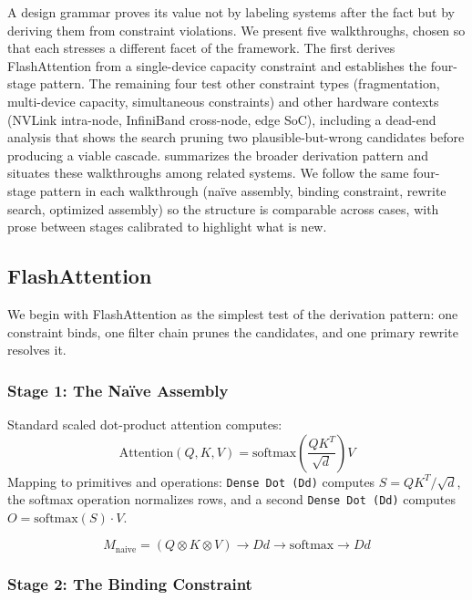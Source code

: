 \documentclass[10pt,twocolumn]{article}
\begin{document}
A design grammar proves its value not by labeling systems after the fact but by deriving them from constraint violations. We present five walkthroughs, chosen so that each stresses a different facet of the framework. The first derives FlashAttention from a single-device capacity constraint and establishes the four-stage pattern. The remaining four test other constraint types (fragmentation, multi-device capacity, simultaneous constraints) and other hardware contexts (NVLink intra-node, InfiniBand cross-node, edge SoC), including a dead-end analysis that shows the search pruning two plausible-but-wrong candidates before producing a viable cascade.  summarizes the broader derivation pattern and situates these walkthroughs among related systems. We follow the same four-stage pattern in each walkthrough (na\"ive assembly, binding constraint, rewrite search, optimized assembly) so the structure is comparable across cases, with prose between stages calibrated to highlight what is new.



\subsection{FlashAttention}
\label{sec:fa-walkthrough}

We begin with FlashAttention \citep{dao2022} as the simplest test of the derivation pattern: one constraint binds, one filter chain prunes the candidates, and one primary rewrite resolves it.

\subsubsection{Stage 1: The Na\"ive Assembly}

Standard scaled dot-product attention \citep{vaswani2017attention} computes:
\[
\text{Attention}(Q, K, V) = \text{softmax}\!\left(\frac{QK^T}{\sqrt{d}}\right) V
\]
Mapping to primitives and operations: \texttt{Dense Dot (Dd)} computes $S = QK^T / \sqrt{d}$, the softmax operation normalizes rows, and a second \texttt{Dense Dot (Dd)} computes $O = \text{softmax}(S) \cdot V$.

\begin{equation}
M_{\text{naive}} = (Q \otimes K \otimes V) \rightarrow Dd \rightarrow \mathrm{softmax} \rightarrow Dd
\end{equation}

\subsubsection{Stage 2: The Binding Constraint}
\end{document}
